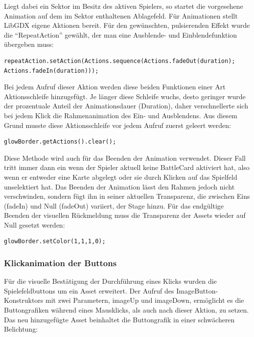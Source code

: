 Liegt dabei ein Sektor im Besitz des aktiven Spielers, so startet die vorgesehene Animation auf dem im Sektor enthaltenen Ablagefeld.
Für Animationen stellt LibGDX eigene Aktionen bereit. Für den gewünschten, pulsierenden Effekt wurde die “RepeatAction” gewählt, der man eine Ausblende- und Einblendefunktion übergeben muss:

\begin{lstlisting}
repeatAction.setAction(Actions.sequence(Actions.fadeOut(duration);
Actions.fadeIn(duration)));
\end{lstlisting}

Bei jedem Aufruf dieser Aktion werden diese beiden Funktionen einer Art Aktionsschleife hinzugefügt. Je länger diese Schleife wuchs, desto geringer wurde der prozentuale Anteil der Animationsdauer (Duration), daher verschnellerte sich bei jedem Klick die Rahmenanimation des Ein- und Ausblendens. Aus diesem Grund musste diese Aktionsschleife vor jedem Aufruf zuerst geleert werden:

\begin{lstlisting}
glowBorder.getActions().clear();
\end{lstlisting}

Diese Methode wird auch für das Beenden der Animation verwendet. Dieser Fall tritt immer dann ein wenn der Spieler aktuell keine BattleCard aktiviert hat, also wenn er entweder eine Karte abgelegt oder sie durch Klicken auf das Spielfeld unselektiert hat.
Das Beenden der Animation lässt den Rahmen jedoch nicht verschwinden, sondern fügt ihn in seiner aktuellen Transparenz, die zwischen Eins (fadeIn) und Null (fadeOut) variiert, der Stage hinzu. Für das endgültige Beenden der visuellen Rückmeldung muss die Transparenz der Assets wieder auf Null gesetzt werden:

\begin{lstlisting}
glowBorder.setColor(1,1,1,0);
\end{lstlisting}

\subsubsection{Klickanimation der Buttons}
Für die visuelle Bestätigung der Durchführung eines Klicks wurden die Spielefeldbuttons um ein Asset erweitert. Der Aufruf des ImageButton-Konstruktors mit zwei Parametern, imageUp und imageDown, ermöglicht es die Buttongrafiken während eines Mausklicks, als auch nach dieser Aktion, zu setzen. Das neu hinzugefügte Asset beinhaltet die Buttongrafik in einer schwächeren Belichtung:

